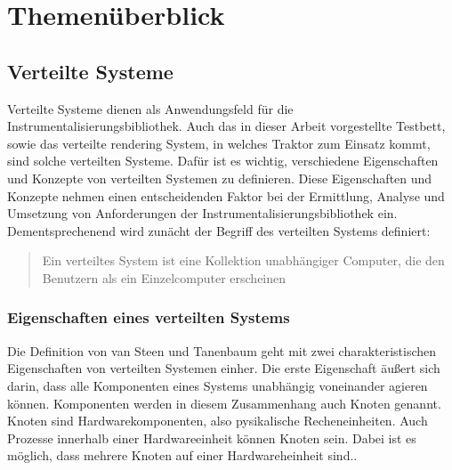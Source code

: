 %

\chapter{Themenüberblick}
\label{chapter:Themenüberblick}

\section{Verteilte Systeme}
\label{section:Verteilte Systeme}

Verteilte Systeme dienen als Anwendungsfeld für die Instrumentalisierungsbibliothek. Auch das in dieser Arbeit vorgestellte Testbett, sowie das verteilte rendering System, in welches Traktor zum Einsatz kommt, sind solche verteilten Systeme. Dafür ist es wichtig, verschiedene Eigenschaften und Konzepte von verteilten Systemen zu definieren. Diese Eigenschaften und Konzepte nehmen einen entscheidenden Faktor bei der Ermittlung, Analyse und Umsetzung von Anforderungen der Instrumentalisierungsbibliothek ein. Dementsprechenend wird zunächt der Begriff des verteilten Systems definiert:

\begin{quote}
	Ein verteiltes System ist eine Kollektion unabhängiger Computer, die den Benutzern als ein Einzelcomputer erscheinen 
\end{quote}

\subsection{Eigenschaften eines verteilten Systems}
\label{subsection:Eigenschaften eines verteilten Systems}
	Die Definition von van Steen und Tanenbaum geht mit zwei charakteristischen Eigenschaften von verteilten Systemen einher. Die erste Eigenschaft äußert sich darin, dass alle Komponenten eines Systems unabhängig voneinander agieren können. Komponenten werden in diesem Zusammenhang auch Knoten genannt. Knoten sind Hardwarekomponenten, also pysikalische Recheneinheiten. Auch Prozesse innerhalb einer Hardwareeinheit können Knoten sein. Dabei ist es möglich, dass mehrere Knoten auf einer Hardwareheinheit sind..

